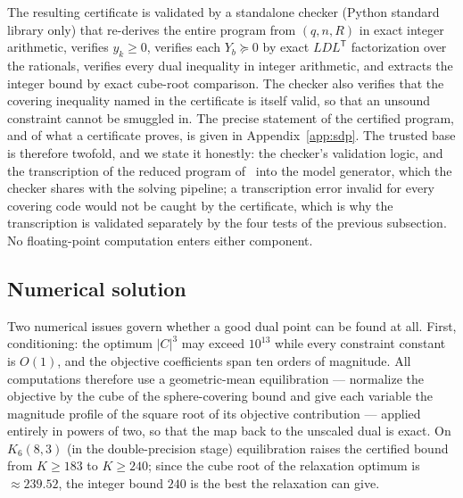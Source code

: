 \documentclass[11pt]{amsart}
\newcommand{\Kq}[3]{K_{#1}(#2,#3)}
\begin{document}
The resulting certificate is validated by a standalone checker (Python
standard library only) that re-derives the entire
program from $(q,n,R)$ in exact integer arithmetic, verifies $y_k\ge 0$,
verifies each $Y_b\succeq 0$ by exact $LDL^{\mathsf T}$ factorization over
the rationals, verifies every dual inequality in integer arithmetic, and
extracts the integer bound by exact cube-root comparison. The checker also
verifies that the covering inequality named in the certificate is itself
valid, so that an unsound constraint cannot be smuggled in. The precise
statement of the certified program, and of what a certificate proves, is
given in Appendix~\ref{app:sdp}. The trusted
base is therefore twofold, and we state it honestly: the checker's
validation logic, and the transcription of the reduced program
of~\cite{GijswijtPolak} into the model generator, which the checker shares
with the solving pipeline; a transcription error invalid for every
covering code would not be caught by the certificate, which is why the
transcription is validated separately by the four tests of the previous
subsection. No floating-point computation enters either component.

\subsection{Numerical solution}\label{sec:lb:numerics}

Two numerical issues govern whether a good dual point can be found at all.
First, conditioning: the optimum $|C|^3$ may exceed $10^{13}$ while every
constraint constant is $O(1)$, and the objective coefficients span ten
orders of magnitude. All computations therefore use a geometric-mean
equilibration --- normalize the objective by the cube of the
sphere-covering bound and give each variable the magnitude profile of the
square root of its objective contribution --- applied entirely in powers of
two, so that the map back to the unscaled dual is exact. On $\Kq{6}{8}{3}$
(in the double-precision stage) equilibration raises the certified bound
from $K\ge 183$ to $K\ge 240$; since the cube root of the relaxation
optimum is ${\approx}239.52$, the integer bound $240$ is the best the
relaxation can give.
\end{document}
